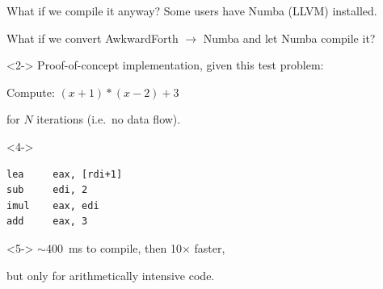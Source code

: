 \documentclass[aspectratio=169]{beamer}
\begin{document}
\begin{frame}[fragile]{What if we compile it anyway?}
\vspace{0.5 cm}
Some users have Numba (LLVM) installed.

\vspace{0.25 cm}
What if we convert AwkwardForth $\to$ Numba and let Numba compile it?

\vspace{0.5 cm}
\begin{uncoverenv}<2->
Proof-of-concept implementation, given this test problem:

\vspace{0.25 cm}
Compute: $(x + 1) * (x - 2) + 3$

for $N$ iterations (i.e.\ no data flow).
\end{uncoverenv}

\vspace{0.25 cm}

\vspace{0.25 cm}
\begin{uncoverenv}<4->
\scriptsize
\begin{verbatim}
lea     eax, [rdi+1]
sub     edi, 2
imul    eax, edi
add     eax, 3
\end{verbatim}
\end{uncoverenv}

\normalsize
\vspace{0.5 cm}
\begin{uncoverenv}<5->
$\sim$400~ms to compile, then 10$\times$ faster,

but only for arithmetically intensive code.
\end{uncoverenv}

\vspace{-5.5 cm}

\end{frame}
\end{document}
